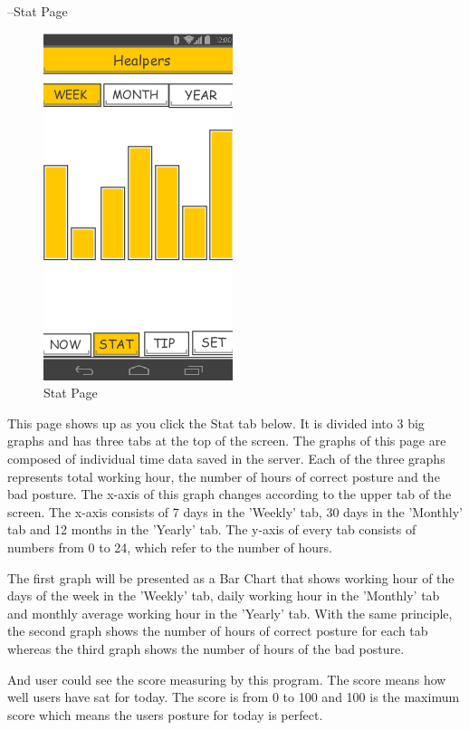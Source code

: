 \documentclass[conference]{IEEEtran}
\begin{document}
 --Stat Page

\begin{figure}[h]
\begin{center}
    \includegraphics[scale=1]{img_13}
    \caption{Stat Page} 
\end{center}
\end{figure}

This page shows up as you click the Stat tab below. It is divided into 3 big graphs and has three tabs at the top of the screen. The graphs of this page are composed of individual time data saved in the server. Each of the  three graphs represents total working hour, the number of hours of correct posture and the bad posture.
The x-axis of this graph changes according to the upper tab of the screen. The x-axis consists of 7 days in the 'Weekly' tab, 30 days in the 'Monthly' tab and 12 months in the 'Yearly' tab.
The y-axis of every tab consists of numbers from 0 to 24, which refer to the number of hours.

 The first graph will be presented as a Bar Chart that shows working hour of the days of the week in the 'Weekly' tab, daily working hour in the 'Monthly' tab and monthly average working hour in the 'Yearly' tab.
With the same principle, the second graph shows the number of hours of correct posture for each tab whereas the third graph shows the number of hours of the bad posture.

And user could see the score measuring by this program. The score means how well users have sat for today. The score is from 0 to 100 and 100 is the maximum score which means the users posture for today is perfect.\\
\end{document}
